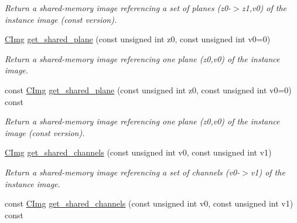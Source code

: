 \begin{DoxyCompactItemize}
\begin{DoxyCompactList}\small\item\em Return a shared-\/memory image referencing a set of planes (z0-\/$>$z1,v0) of the instance image (const version). \end{DoxyCompactList}\item 
\hypertarget{structcimg__library_1_1_c_img_afca9bb286cfa7964bf5ae3b48791e86f}{\hyperlink{structcimg__library_1_1_c_img}{C\-Img} \hyperlink{structcimg__library_1_1_c_img_afca9bb286cfa7964bf5ae3b48791e86f}{get\-\_\-shared\-\_\-plane} (const unsigned int z0, const unsigned int v0=0)}\label{structcimg__library_1_1_c_img_afca9bb286cfa7964bf5ae3b48791e86f}

\begin{DoxyCompactList}\small\item\em Return a shared-\/memory image referencing one plane (z0,v0) of the instance image. \end{DoxyCompactList}\item 
\hypertarget{structcimg__library_1_1_c_img_a8f379d2747764150b87f1542ee1fdbaf}{const \hyperlink{structcimg__library_1_1_c_img}{C\-Img} \hyperlink{structcimg__library_1_1_c_img_a8f379d2747764150b87f1542ee1fdbaf}{get\-\_\-shared\-\_\-plane} (const unsigned int z0, const unsigned int v0=0) const }\label{structcimg__library_1_1_c_img_a8f379d2747764150b87f1542ee1fdbaf}

\begin{DoxyCompactList}\small\item\em Return a shared-\/memory image referencing one plane (z0,v0) of the instance image (const version). \end{DoxyCompactList}\item 
\hypertarget{structcimg__library_1_1_c_img_a910439b3bf66d2f01a6c7516d504faa6}{\hyperlink{structcimg__library_1_1_c_img}{C\-Img} \hyperlink{structcimg__library_1_1_c_img_a910439b3bf66d2f01a6c7516d504faa6}{get\-\_\-shared\-\_\-channels} (const unsigned int v0, const unsigned int v1)}\label{structcimg__library_1_1_c_img_a910439b3bf66d2f01a6c7516d504faa6}

\begin{DoxyCompactList}\small\item\em Return a shared-\/memory image referencing a set of channels (v0-\/$>$v1) of the instance image. \end{DoxyCompactList}\item 
\hypertarget{structcimg__library_1_1_c_img_a736815226ced7ea3cbf721dcc3c55e2d}{const \hyperlink{structcimg__library_1_1_c_img}{C\-Img} \hyperlink{structcimg__library_1_1_c_img_a736815226ced7ea3cbf721dcc3c55e2d}{get\-\_\-shared\-\_\-channels} (const unsigned int v0, const unsigned int v1) const }\label{structcimg__library_1_1_c_img_a736815226ced7ea3cbf721dcc3c55e2d}


\end{DoxyCompactItemize}
